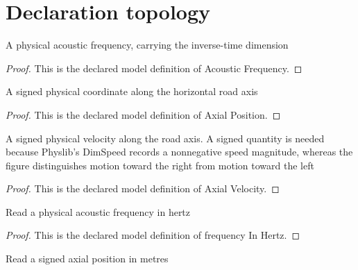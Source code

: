 \section{Declaration topology}
\begin{definition}
  \label{def:physics:phyx-mini-0195:phyxminiproblems-problemphyxmini0195-acousticfrequency}
  A physical acoustic frequency, carrying the inverse-time dimension
\end{definition}
\begin{proof}
  This is the declared model definition of Acoustic Frequency.
\end{proof}
\begin{definition}
  \label{def:physics:phyx-mini-0195:phyxminiproblems-problemphyxmini0195-axialposition}
  A signed physical coordinate along the horizontal road axis
\end{definition}
\begin{proof}
  This is the declared model definition of Axial Position.
\end{proof}
\begin{definition}
  \label{def:physics:phyx-mini-0195:phyxminiproblems-problemphyxmini0195-axialvelocity}
  A signed physical velocity along the road axis. A signed quantity is needed because Physlib's DimSpeed records a nonnegative speed magnitude, whereas the figure distinguishes motion toward the right from motion toward the left
\end{definition}
\begin{proof}
  This is the declared model definition of Axial Velocity.
\end{proof}
\begin{definition}
  \label{def:physics:phyx-mini-0195:phyxminiproblems-problemphyxmini0195-frequencyinhertz}
  Read a physical acoustic frequency in hertz
\end{definition}
\begin{proof}
  This is the declared model definition of frequency In Hertz.
\end{proof}
\begin{definition}
  \label{def:physics:phyx-mini-0195:phyxminiproblems-problemphyxmini0195-positioninmeters}
  Read a signed axial position in metres
\end{definition}
